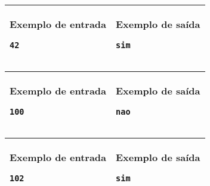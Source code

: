 \begin{table}[!h]
\centering
\begin{tabular}{|l|l|}
\hline
\begin{minipage}[t]{3in}
\textbf{Exemplo de entrada}
\begin{verbatim}
42
\end{verbatim}
\vspace{1mm}
\end{minipage}
&
\begin{minipage}[t]{3in}
\textbf{Exemplo de saída}
\begin{verbatim}
sim
\end{verbatim}
\vspace{1mm}
\end{minipage} \\
\hline
\end{tabular}
\end{table}

\begin{table}[!h]
\centering
\begin{tabular}{|l|l|}
\hline
\begin{minipage}[t]{3in}
\textbf{Exemplo de entrada}
\begin{verbatim}
100
\end{verbatim}
\vspace{1mm}
\end{minipage}
&
\begin{minipage}[t]{3in}
\textbf{Exemplo de saída}
\begin{verbatim}
nao
\end{verbatim}
\vspace{1mm}
\end{minipage} \\
\hline
\end{tabular}
\end{table}

\begin{table}[!h]
\centering
\begin{tabular}{|l|l|}
\hline
\begin{minipage}[t]{3in}
\textbf{Exemplo de entrada}
\begin{verbatim}
102
\end{verbatim}
\vspace{1mm}
\end{minipage}
&
\begin{minipage}[t]{3in}
\textbf{Exemplo de saída}
\begin{verbatim}
sim
\end{verbatim}
\vspace{1mm}
\end{minipage} \\
\hline
\end{tabular}
\end{table}


